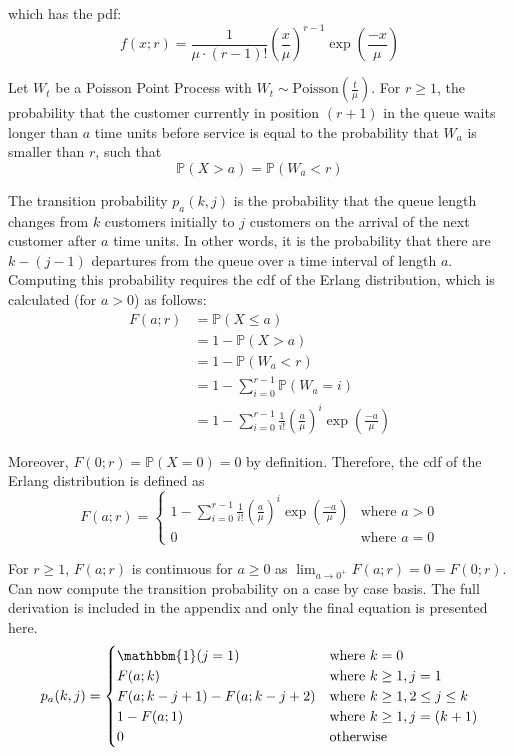 which has the pdf:
\begin{equation}
	f (x; r) = \frac{1}{\mu \cdot (r - 1)!} \left( \frac{x}{\mu} \right)^{r - 1} \exp \left( \frac{-x}{\mu} \right)
\end{equation}

Let $W_{t}$ be a Poisson Point Process with $W_{t} \sim \text{Poisson} \left( \frac{t}{\mu} \right)$. For $r \geq 1$, the probability that the customer currently in position $(r + 1)$ in the queue waits longer than $a$ time units before service is equal to the probability that $W_{a}$ is smaller than $r$, such that
\begin{equation}
	\mathbb{P} (X > a) = \mathbb{P} (W_{a} < r)
\end{equation}

The transition probability $p_{a} (k, j)$ is the probability that the queue length changes from $k$ customers initially to $j$ customers on the arrival of the next customer after $a$ time units. In other words, it is the probability that there are $k - (j - 1)$ departures from the queue over a time interval of length $a$. Computing this probability requires the cdf of the Erlang distribution, which is calculated (for $a > 0$) as follows:
\begin{align*}
	F (a; r) & = \mathbb{P} (X \leq a) \\
	& = 1 - \mathbb{P} (X > a) \\
	& = 1 - \mathbb{P} (W_{a} < r) \\
	& = 1 - \sum_{i = 0}^{r - 1} \mathbb{P} (W_{a} = i) \\
	& = 1 - \sum_{i = 0}^{r - 1} \frac{1}{i!} \left( \frac{a}{\mu} \right)^{i} \exp \left( \frac{-a}{\mu} \right)
\end{align*}

Moreover, $F (0; r) = \mathbb{P} (X = 0) = 0$ by definition. Therefore, the cdf of the Erlang distribution is defined as
\begin{equation}
	F (a; r) = \begin{cases} 1 - \sum_{i = 0}^{r - 1} \frac{1}{i!} \left( \frac{a}{\mu} \right)^{i} \exp \left( \frac{-a}{\mu} \right) & \text{where $a > 0$} \\ 0 & \text{where $a = 0$} \end{cases}
\end{equation}

For $r \geq 1$, $F (a; r)$ is continuous for $a \geq 0$ as $\displaystyle \lim_{a \to 0^{+}} F (a; r) = 0 = F (0; r)$. Can now compute the transition probability on a case by case basis. The full derivation is included in the appendix and only the final equation is presented here.
\begin{equation}
	p_{a} (k, j) = \begin{cases}
		\mathbbm{1} (j = 1) & \text{where $k = 0$} \\
		F (a; k) & \text{where $k \geq 1, j = 1$} \\
		F (a; k - j + 1) - F (a; k - j + 2) & \text{where $k \geq 1, 2 \leq j \leq k$} \\
		1 - F (a; 1) & \text{where $k \geq 1, j = (k + 1)$} \\
		0 & \text{otherwise}
	\end{cases}
\end{equation}


